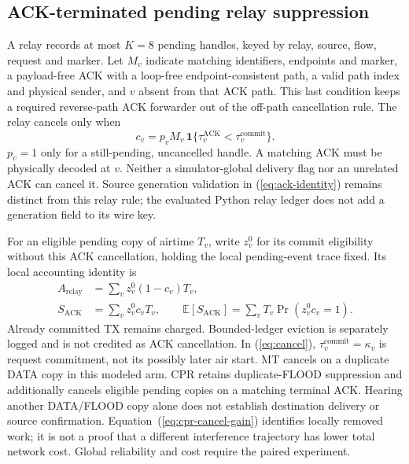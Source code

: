 \documentclass[conference,letterpaper,10pt]{IEEEtran}
\begin{document}
\subsection{ACK-terminated pending relay suppression}
A relay records at most $K=8$ pending handles, keyed by relay, source,
flow, request and marker. Let $M_v$ indicate matching identifiers,
endpoints and marker, a payload-free ACK with a loop-free endpoint-consistent
path, a valid path index and physical sender, and $v$ absent from that ACK
path. This last condition keeps a required reverse-path ACK forwarder
out of the off-path cancellation rule. The relay cancels only when
\begin{equation}
c_v=p_v M_v\,
 \mathbf 1\{\tau_v^{\mathrm{ACK}}<\tau_v^{\mathrm{commit}}\}.
\label{eq:cancel}
\end{equation}
$p_v=1$ only for a still-pending, uncancelled handle.
A matching ACK must be physically decoded at $v$.
Neither a simulator-global delivery flag nor an unrelated ACK can cancel it.
Source generation validation in (\ref{eq:ack-identity}) remains distinct
from this relay rule; the evaluated Python relay ledger does not add a
generation field to its wire key.

For an eligible pending copy of airtime $T_v$, write $z_v^0$ for its
commit eligibility without this ACK cancellation, holding the local
pending-event trace fixed. Its local accounting identity is
\begin{equation}
\begin{aligned}
A_{\mathrm{relay}}&=\sum_v z_v^0(1-c_v)T_v,\\
S_{\mathrm{ACK}}&=\sum_v z_v^0c_vT_v,\qquad
\mathbb E[S_{\mathrm{ACK}}]=\sum_vT_v\Pr(z_v^0c_v=1).
\end{aligned}
\label{eq:cpr-cancel-gain}
\end{equation}
Already committed TX remains charged. Bounded-ledger eviction is separately
logged and is not credited as ACK cancellation.
In (\ref{eq:cancel}), $\tau_v^{\mathrm{commit}}=\kappa_v$ is request
commitment, not its possibly later air start. MT cancels on a duplicate DATA
copy in this modeled arm. CPR retains duplicate-FLOOD suppression and
additionally cancels eligible pending copies on a matching terminal ACK.
Hearing another DATA/FLOOD copy alone does not establish destination
delivery or source confirmation.
Equation~(\ref{eq:cpr-cancel-gain}) identifies locally removed work; it is
not a proof that a different interference trajectory has lower total
network cost. Global reliability and cost require the paired experiment.
\end{document}
